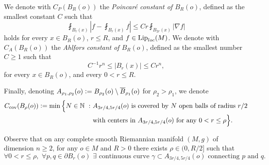 \documentclass[a4paper,12pt,reqno]{amsart}
\numberwithin{equation}{section}
\theoremstyle{plain}
\theoremstyle{definition}
\theoremstyle{remark}
\newcommand{\abs}[1]{\left\lvert#1\right\rvert}
\newcommand{\st}{\ensuremath{\ :\ }} %
\newcommand{\eqdef}{\ensuremath{\vcentcolon=}}
\DeclareMathOperator{\Lip}{Lip}
\begin{document}
{We denote with $C_P(B_R(o))$ the \textit{Poincar\'e constant of $B_R(o)$}, defined as the smallest constant $C$ such that
\begin{equation}\label{eqn:PoincareConstant}
\fint_{B_r(x)}\left|f-\fint_{B_r(x)}f\right|\leq Cr\fint_{B_{2r}(x)}|\nabla f|
\end{equation}
holds for every $x\in B_R(o)$, $r\leq R$, and $f \in \Lip_{\rm loc}(M)$. We denote with $C_A (B_R(o))$ the \textit{Ahlfors constant  of $B_R(o)$}, defined as the smallest number $C\geq 1$ such that
\begin{equation}\label{eqn:AhlforsConstant}
C^{-1} r^n \leq \abs{B_r(x)} \leq C r^n,
\end{equation}
for every $x \in B_R(o)$, and every $0 <r \leq R$.

Finally, denoting $A_{\rho_1,\rho_2}(o)\eqdef B_{\rho_2}(o)\setminus \overline{B}_{\rho_1}(o)$ for $\rho_2>\rho_1$, we denote
\begin{equation}\label{eqn:CCov}
\begin{split}
C_{\mathrm{cov}} (B_\rho(o))\eqdef \min\Big\{N\in\mathbb N \st 
&\text{$A_{3r/4,5r/4}(o)$ is covered by $N$ open balls of radius $r/2$} \\
&\text{with centers in $A_{3r/4,5r/4}(o)$ for any $0<r\leq \rho$} \Big\}.
\end{split}
\end{equation}


Observe that on any complete smooth Riemannian manifold $(M,g)$ of dimension $n\ge2$, for any $o \in M$ and $R>0$ there exists $\rho\in(0, R/2]$ such that
\begin{equation}\label{eqn:CondizioneConnessione}
    \text{$\forall 0<r\leq \rho,\,\, \forall p,q \in \partial B_{r}(o)\,\, \exists$ continuous curve $\gamma\subset A_{3r/4,5r/4}(o)$ connecting $p$ and $q$.}
\end{equation}

}
\end{document}
